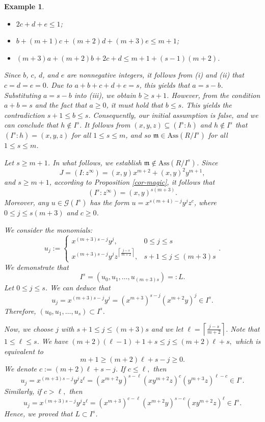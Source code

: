 \documentclass[11pt]{amsart}
\newtheorem{example}[theorem]{Example}
\begin{document}
\begin{example}
{  \begin{itemize}
\item[(i)] $2c + d + e \le 1$;
\item[(ii)] $b + (m+1)c + (m+2)d + (m+3)e \le m+1$; 
\item[(iii)] $(m+3)a + (m+2)b +2c+d \le m+1+(s-1)(m+2)$. 
\end{itemize}
Since $b$, \(c\), \(d\), and \(e\) are nonnegative integers, it follows from (i) and (ii) that \(c = d = e = 0\).
 Due to  $a + b + c + d + e = s$, this yields that  $a = s - b$.
Substituting \(a = s - b\) into (iii), we obtain $b \ge s + 1$.  However, from the condition $a + b = s$ and the fact that $a \ge 0$, 
it must hold that $b \le s$. This yields the contradiction $s + 1 \le b \le s$. Consequently,  our initial assumption is false, and we can 
conclude that $h \notin I^s$. It follows from $(x,y,z) \subseteq (I^s : h)$ and $h \notin I^s$ that $(I^s : h) = (x,y,z)$ for all $1\leq s \leq m$, 
and so $\mathfrak{m}\in \mathrm{Ass}(R/I^s)$ for all $1\leq s\leq m$. 

Let $s\geq m+1$. In what follows, we establish $\mathfrak{m}\notin \mathrm{Ass}(R/I^{s})$. 
Since $$J=(I:z^{\infty})=(x,y) x^{m+2} + (x,y)^2 y^{m+1},$$
and $s\geq m+1$, according to Proposition \ref{cor-magic}, it follows that 
$$(I^s:z^{\infty})=(x,y)^{s(m+3)}.$$
Moreover, any $u\in \mathcal G(I^s)$ has the form $u=x^{s(m+4)-j}y^jz^c$, where $0\leq j\leq s(m+3)$ and $c\geq 0$.

We consider the monomials:
$$ u_j := \begin{cases} x^{(m+3)s-j} y^j, & 0\leq j\leq s \\ x^{(m+3)s-j}y^jz^{\left\lceil \frac{j-s}{m+2} \right\rceil}, 
& s+1\leq j\leq (m+3)s \end{cases}.$$
We demonstrate that 
$$I^s = (u_0,u_1,\ldots,u_{(m+3)s})=:L.$$
Let $0\leq j\leq s$. We can deduce that 
$$u_j = x^{(m+3)s-j}y^j = (x^{m+3})^{s-j}(x^{m+2}y)^j \in I^s.$$
Therefore, $(u_0,u_1,\ldots,u_s) \subset I^s$.

Now, we choose $j$ with $s+1\leq j\leq (m+3)s$ and we let $\ell=\left\lceil \frac{j-s}{m+2} \right\rceil$.
Note that $1\leq \ell\leq s$.
We have  $(m+2)(\ell-1)+1+s \leq  j \leq  (m+2)\ell +s,$ which is equivalent to $$ m+1 \geq  (m+2)\ell+s-j  \geq 0. $$
We denote $c:=(m+2)\ell+s-j$. 
If $c\leq \ell,$ then
$$u_j = x^{(m+3)s-j}y^jz^{\ell} = (x^{m+2}y)^{s-\ell}(xy^{m+2}z)^c(y^{m+3}z)^{\ell-c} \in I^s.$$
Similarly, if $c>\ell,$ then
$$u_j = x^{(m+3)s-j}y^jz^{\ell} = (x^{m+3})^{c-\ell}(x^{m+2}y)^{s-c}(xy^{m+2}z)^{\ell} \in I^s.$$
Hence, we proved that $L\subset I^s$.

}
\end{example}
\end{document}
